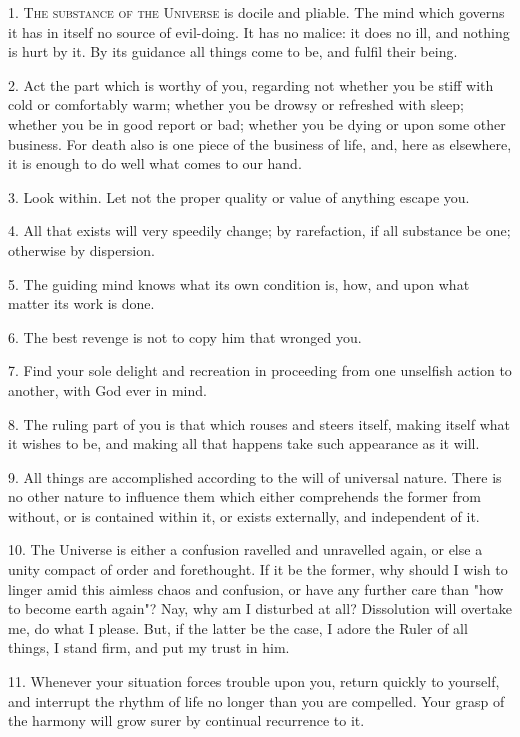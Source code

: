 \documentclass{book}
\begin{document}
1. \textsc{The substance of the Universe} is docile and pliable. The
mind which governs it has in itself no source of evil-doing. It has no
malice: it does no ill, and nothing is hurt by it. By its guidance all
things come to be, and fulfil their being.

2. Act the part which is worthy of you, regarding not whether you be
stiff with cold or comfortably warm; whether you be drowsy or
refreshed with sleep; whether you be in good report or bad; whether
you be dying or upon some other business. For death also is one piece
of the business of life, and, here as elsewhere, it is enough to do
well what comes to our hand.

3. Look within. Let not the proper quality or value of anything escape
you.

4. All that exists will very speedily change; by rarefaction, if all
substance be one; otherwise by dispersion.

5. The guiding mind knows what its own condition is, how, and upon
what matter its work is done.

6. The best revenge is not to copy him that wronged you.

\newpage

7. Find your sole delight and recreation in proceeding from one
unselfish action to another, with God ever in mind.

8. The ruling part of you is that which rouses and steers itself,
making itself what it wishes to be, and making all that happens take
such appearance as it will.

9. All things are accomplished according to the will of universal
nature. There is no other nature to influence them which either
comprehends the former from without, or is contained within it, or
exists externally, and independent of it.

10. The Universe is either a confusion ravelled and unravelled again,
or else a unity compact of order and forethought. If it be the former,
why should I wish to linger amid this aimless chaos and confusion, or
have any further care than "how to become earth again"? Nay, why am I
disturbed at all? Dissolution will overtake me, do what I please. But,
if the latter be the case, I adore the Ruler of all things, I stand
firm, and put my trust in him.

11. Whenever your situation forces trouble upon you, return quickly to
yourself, and interrupt the rhythm of life no longer than you are
compelled. Your grasp of the harmony will grow surer by continual
recurrence to it.
\end{document}

